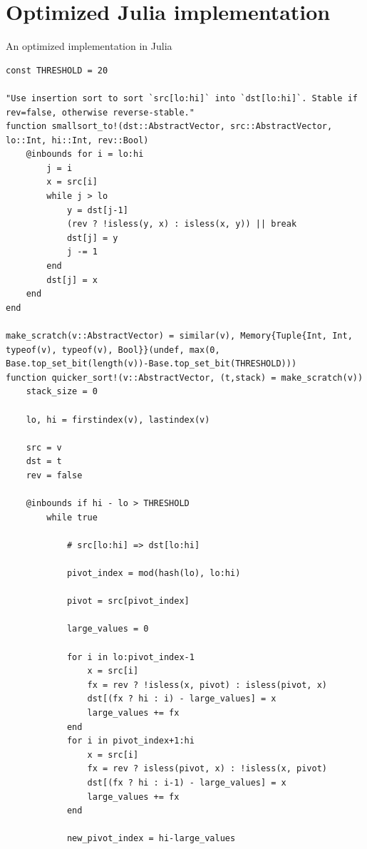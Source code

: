 \documentclass{juliacon}
\begin{document}
\section{Optimized Julia implementation}

An optimized implementation in Julia

\begin{lstlisting}
const THRESHOLD = 20

"Use insertion sort to sort `src[lo:hi]` into `dst[lo:hi]`. Stable if rev=false, otherwise reverse-stable."
function smallsort_to!(dst::AbstractVector, src::AbstractVector, lo::Int, hi::Int, rev::Bool)
    @inbounds for i = lo:hi
        j = i
        x = src[i]
        while j > lo
            y = dst[j-1]
            (rev ? !isless(y, x) : isless(x, y)) || break
            dst[j] = y
            j -= 1
        end
        dst[j] = x
    end
end

make_scratch(v::AbstractVector) = similar(v), Memory{Tuple{Int, Int, typeof(v), typeof(v), Bool}}(undef, max(0, Base.top_set_bit(length(v))-Base.top_set_bit(THRESHOLD)))
function quicker_sort!(v::AbstractVector, (t,stack) = make_scratch(v))
    stack_size = 0

    lo, hi = firstindex(v), lastindex(v)

    src = v
    dst = t
    rev = false

    @inbounds if hi - lo > THRESHOLD
        while true

            # src[lo:hi] => dst[lo:hi]

            pivot_index = mod(hash(lo), lo:hi)

            pivot = src[pivot_index]

            large_values = 0

            for i in lo:pivot_index-1
                x = src[i]
                fx = rev ? !isless(x, pivot) : isless(pivot, x)
                dst[(fx ? hi : i) - large_values] = x
                large_values += fx
            end
            for i in pivot_index+1:hi
                x = src[i]
                fx = rev ? isless(pivot, x) : !isless(x, pivot)
                dst[(fx ? hi : i-1) - large_values] = x
                large_values += fx
            end

            new_pivot_index = hi-large_values


\end{lstlisting}
\end{document}
